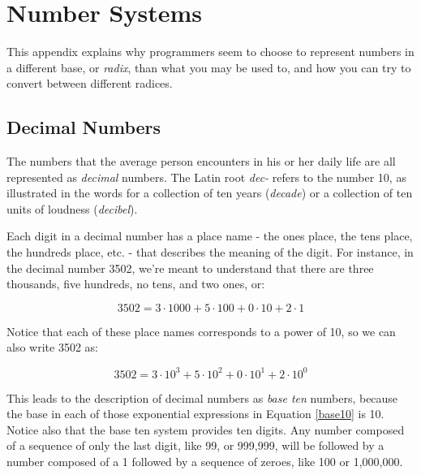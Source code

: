 
\chapter{Number Systems}
\label{appendix:numbersystems}

\minitoc

This appendix explains why programmers seem to choose to represent numbers in a different base, or \textit{radix}, than what you may be used to, and how you can try to convert between different radices.

\setcounter{section}{9}
\section{Decimal Numbers}
The numbers that the average person encounters in his or her daily life are all represented as \textit{decimal} numbers.  The Latin root \textit{dec-} refers to the number 10, as illustrated in the words for a collection of ten years (\textit{decade}) or a collection of ten units of loudness (\textit{decibel}).

Each digit in a decimal number has a place name - the ones place, the tens place, the hundreds place, etc. - that describes the meaning of the digit.  For instance, in the decimal number 3502, we're meant to understand that there are three thousands, five hundreds, no tens, and two ones, or:

\[ 3502 = 3 \cdot 1000 + 5 \cdot 100 + 0 \cdot 10 + 2 \cdot 1 \]

Notice that each of these place names corresponds to a power of 10, so we can also write 3502 as:

\begin{equation}\label{base10}3502 = 3 \cdot 10^3 + 5 \cdot 10^2 + 0 \cdot 10^1 + 2 \cdot 10^0\end{equation}

This leads to the description of decimal numbers as \textit{base ten} numbers, because the base in each of those exponential expressions in Equation \ref{base10} is 10.  Notice also that the base ten system provides ten digits.  Any number composed of a sequence of only the last digit, like 99, or 999,999, will be followed by a number composed of a 1 followed by a sequence of zeroes, like 100 or 1,000,000.

\setcounter{section}{1}
